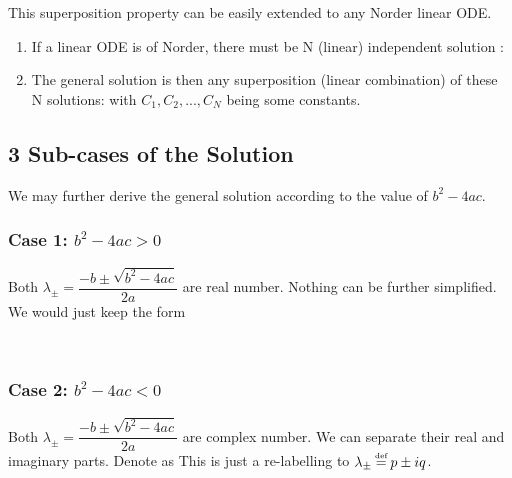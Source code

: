 \documentclass[class=article, crop=false, 12pt]{standalone}
\begin{document}
\begin{notation}
    This superposition property can be easily extended to any N\Nth order linear ODE. 
    \begin{enumerate}
        \item If a linear ODE is of N\Nth order, 
        there must be N (linear) independent solution :

        \item The general solution is then any superposition (linear combination) of these N solutions:
        with $C_1, C_2,...,C_N$ being some constants.
    \end{enumerate}
\end{notation}



\subsection{3 Sub-cases of the Solution}

We may further derive the general solution according to the value of $b^2-4ac$.

\subsubsection{Case 1: $b^2-4ac>0$}

Both $\lambda_\pm = \dfrac{-b\pm\sqrt{b^2-4ac}}{2a}$ are real number. 
Nothing can be further simplified. 
We would just keep the form

\hfill\\[-3em]
\subsubsection{Case 2: $b^2-4ac<0$}

Both $\lambda_\pm = \dfrac{-b\pm\sqrt{b^2-4ac}}{2a}$ are complex number.
We can separate their real and imaginary parts. Denote as
This is just a re-labelling to $\lambda_\pm \defeq p\pm iq$. \\
\end{document}
